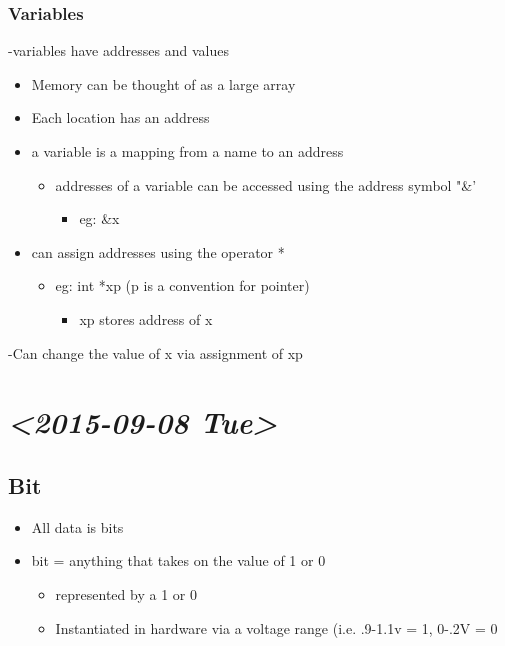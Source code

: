 \documentclass[11pt]{article}
\begin{document}
\subsubsection{Variables}
\label{sec-1-1-1}
-variables have addresses and values
\begin{itemize}
\item Memory can be thought of as a large array
\item Each location has an address
\item a variable is a mapping from a name to an address
\begin{itemize}
\item addresses of a variable can be accessed using the address symbol "\&'
\begin{itemize}
\item eg: \&x
\end{itemize}
\end{itemize}
\item can assign addresses using the operator *
\begin{itemize}
\item eg: int *xp (p is a convention for pointer)
\begin{itemize}
\item xp stores address of x
\end{itemize}
\end{itemize}
\end{itemize}
-Can change the value of x via assignment of xp
\section{\textit{<2015-09-08 Tue>}}
\label{sec-2}
\subsection{Bit}
\label{sec-2-1}
\begin{itemize}
\item All data is bits
\item bit = anything that takes on the value of 1 or 0
\begin{itemize}
\item represented by a 1 or 0
\item Instantiated in hardware via a voltage range (i.e. .9-1.1v = 1, 0-.2V = 0
\end{itemize}
\end{itemize}
\end{document}
